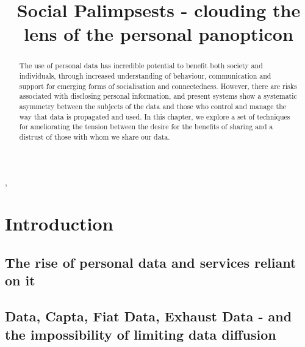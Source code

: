 \documentclass{IOS-Book-Article}     %
\begin{document}
\begin{frontmatter}          %
%
\title{Social Palimpsests - clouding the lens of the personal panopticon}

\author[A]{ },
\author[B]{ }
\author[B]{ }
\address[A]{Centre for Intelligent Systems and Applications,
Department of Informatics, University of Edinburgh}
\address[B]{Southampton}

\begin{abstract}
The use of personal data has incredible potential to benefit both society and
individuals, through increased understanding of behaviour, communication and
support for emerging forms of socialisation and connectedness. However, there
are risks associated with disclosing personal information, and present systems
show a systematic asymmetry between the subjects of the data and those who
control and manage the way that data is propagated and used. In this chapter, we
explore a set of techniques for ameliorating the tension between the desire for
the benefits of sharing and a distrust of those with whom we share our data.
\end{abstract}

\begin{keyword}

\end{keyword}

\end{frontmatter}


\section*{Introduction}

\subsection{The rise of personal data and services reliant on it}

\subsection{Data, Capta, Fiat Data, Exhaust Data - and the impossibility
of limiting data diffusion}
\end{document}
